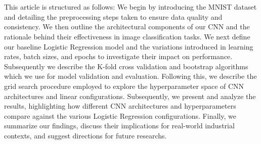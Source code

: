 \\
\\
This article is structured as follows: We begin by introducing the MNIST dataset and detailing the preprocessing steps taken to ensure data quality and consistency. We then outline the architectural components of our CNN and the rationale behind their effectiveness in image classification tasks. We next define our baseline Logistic Regression model and the variations introduced in learning rates, batch sizes, and epochs to investigate their impact on performance. Subsequently we describe the K-fold cross validation and bootstrap algorithms which we use for model validation and evaluation. Following this, we describe the grid search procedure employed to explore the hyperparameter space of CNN architectures and linear configurations. Subsequently, we present and analyze the results, highlighting how different CNN architectures and hyperparameters compare against the various Logistic Regression configurations. Finally, we summarize our findings, discuss their implications for real-world industrial contexts, and suggest directions for future researchs.




